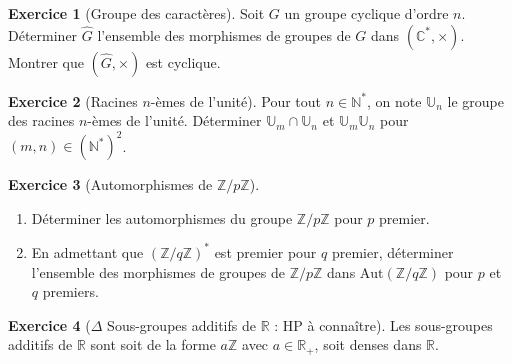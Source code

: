 \documentclass[french]{book}
\newcommand{\N}{\mathbb{N}}
\newcommand{\Z}{\mathbb{Z}}
\newcommand{\R}{\mathbb{R}}
\newcommand{\C}{\mathbb{C}}
\newcommand{\U}{\mathbb{U}}
\newcommand{\st}{^*}
\theoremstyle{definition}
\newtheorem{ex}{Exercice}[chapter]
\theoremstyle{theorem}
\theoremstyle{remark}
\begin{document}
\begin{ex}[Groupe des caractères]
	Soit $G$ un groupe cyclique d'ordre $n$. Déterminer $\hat{G}$ l'ensemble des morphismes de groupes de $G$ dans $(\C\st,\times)$. Montrer que $(\hat{G},\times)$ est cyclique.
\end{ex}

\begin{ex}[Racines $n$-èmes de l'unité]
	Pour tout $n\in\N\st$, on note $\U_n$ le groupe des racines $n$-èmes de l'unité. Déterminer $\U_m\cap\U_n$ et $\U_m\U_n$ pour $(m,n)\in(\N\st)^2$.
\end{ex}

\begin{ex}[Automorphismes de $\Z/p\Z$]
	\begin{enumerate}
		\item Déterminer les automorphismes du groupe $\Z/p\Z$ pour $p$ premier.
		\item En admettant que $(\Z/q\Z)\st$ est premier pour $q$ premier, déterminer l'ensemble des morphismes de groupes de $\Z/p\Z$ dans $\text{Aut}(\Z/q\Z)$ pour $p$ et $q$ premiers.
	\end{enumerate}
\end{ex}

\begin{ex}[$\Delta$ Sous-groupes additifs de $\R$ : HP à connaître]
	Les sous-groupes additifs de $\R$ sont soit de la forme $a\Z$ avec $a\in\R_+$, soit denses dans $\R$.
\end{ex}
\end{document}
